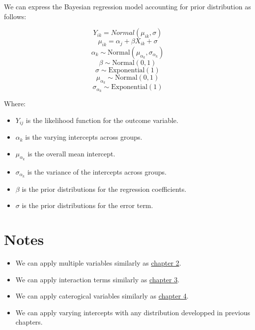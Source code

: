 \documentclass[
  letterpaper,
  DIV=11,
  numbers=noendperiod]{scrreprt}
\begin{document}
We can express the Bayesian regression model accounting for prior
distribution as follows:

\[
Y_{ik} = Normal(\mu_{ik}, \sigma)
\] \[
\mu_{ik} = \alpha_j + \beta X_{ik} + \sigma 
\] \[
\alpha_k \sim \text{Normal}(\mu_{\alpha_k}, \sigma_{\alpha_k}) 
\] \[
\beta \sim \text{Normal}(0, 1)
\] \[
\sigma \sim \text{Exponential}(1)
\] \[
\mu_{\alpha_k} \sim \text{Normal}(0, 1)
\] \[
\sigma_{\alpha_k} \sim \text{Exponential}(1)
\]

Where:

\begin{itemize}
\item
  \(Y_{ij}\) is the likelihood function for the outcome variable.
\item
  \(\alpha_k\) is the varying intercepts across groups.
\item
  \(\mu_{\alpha_k}\) is the overall mean intercept.
\item
  \(\sigma_{\alpha_k}\) is the variance of the intercepts across groups.
\item
  \(\beta\) is the prior distributions for the regression coefficients.
\item
  \(\sigma\) is the prior distributions for the error term.
\end{itemize}

\section{Notes}\label{notes-4}

\begin{tcolorbox}[enhanced jigsaw, toptitle=1mm, opacityback=0, titlerule=0mm, breakable, bottomrule=.15mm, colframe=quarto-callout-note-color-frame, arc=.35mm, coltitle=black, left=2mm, opacitybacktitle=0.6, leftrule=.75mm, toprule=.15mm, rightrule=.15mm, bottomtitle=1mm, colbacktitle=quarto-callout-note-color!10!white, title=\textcolor{quarto-callout-note-color}{\faInfo}\hspace{0.5em}{Note}, colback=white]

\begin{itemize}
\item
  We can apply multiple variables similarly as
  \href{./2.\%20Multiple\%20Regression\%20for\%20Continuous\%20Variables.qmd}{chapter
  2}.
\item
  We can apply interaction terms similarly as
  \href{/3.\%20Interaction\%20between\%20continuous\%20variables.qmd}{chapter
  3}.
\item
  We can apply caterogical variables similarly as
  \href{4.\%20Categorical\%20variable.qmd}{chapter 4}.
\item
  We can apply varying intercepts with any distribution developped in
  previous chapters.
\end{itemize}

\end{tcolorbox}
\end{document}
